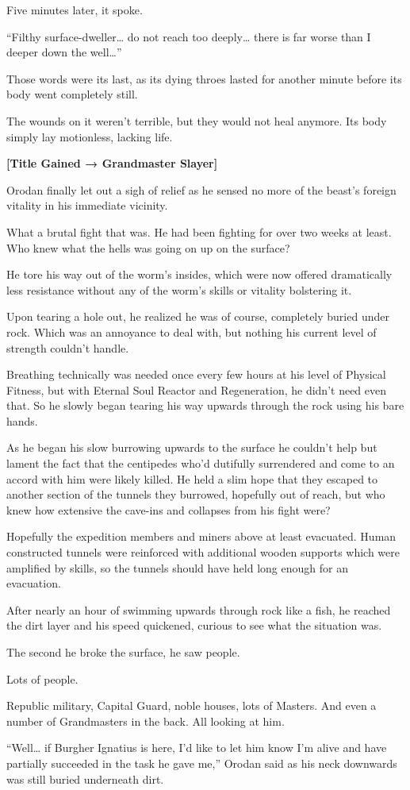 \documentclass[a4paper,10pt]{book}
\begin{document}
Five minutes later, it spoke.\par
“Filthy surface-dweller… do not reach too deeply… there is far worse than I deeper down the well…”\par
Those words were its last, as its dying throes lasted for another minute before its body went completely still.\par
The wounds on it weren’t terrible, but they would not heal anymore. Its body simply lay motionless, lacking life.\par
\textbf{[Title Gained → Grandmaster Slayer]}\par
Orodan finally let out a sigh of relief as he sensed no more of the beast’s foreign vitality in his immediate vicinity.\par
What a brutal fight that was. He had been fighting for over two weeks at least. Who knew what the hells was going on up on the surface?\par
He tore his way out of the worm’s insides, which were now offered dramatically less resistance without any of the worm’s skills or vitality bolstering it.\par
Upon tearing a hole out, he realized he was of course, completely buried under rock. Which was an annoyance to deal with, but nothing his current level of strength couldn’t handle.\par
Breathing technically was needed once every few hours at his level of Physical Fitness, but with Eternal Soul Reactor and Regeneration, he didn’t need even that. So he slowly began tearing his way upwards through the rock using his bare hands.\par
As he began his slow burrowing upwards to the surface he couldn’t help but lament the fact that the centipedes who’d dutifully surrendered and come to an accord with him were likely killed. He held a slim hope that they escaped to another section of the tunnels they burrowed, hopefully out of reach, but who knew how extensive the cave-ins and collapses from his fight were?\par
Hopefully the expedition members and miners above at least evacuated. Human constructed tunnels were reinforced with additional wooden supports which were amplified by skills, so the tunnels should have held long enough for an evacuation.\par
After nearly an hour of swimming upwards through rock like a fish, he reached the dirt layer and his speed quickened, curious to see what the situation was.\par
The second he broke the surface, he saw people.\par
Lots of people.\par
Republic military, Capital Guard, noble houses, lots of Masters. And even a number of Grandmasters in the back. All looking at him.\par
“Well… if Burgher Ignatius is here, I’d like to let him know I’m alive and have partially succeeded in the task he gave me,” Orodan said as his neck downwards was still buried underneath dirt.\par
\end{document}
